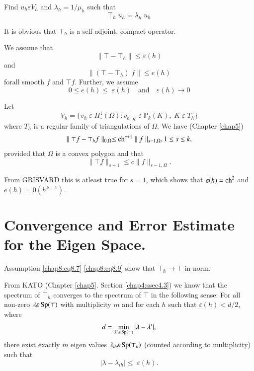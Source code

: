 Find $u_h\varepsilon V_h$ and $\lambda_h=1/\mu_h$ such that 
\begin{equation}\label{chap8:eq8.6}
\top_h\;u_h=\lambda_h\;u_h
\end{equation}

It is obvious that $\top_h$ is a self-adjoint, compact operator. 

We assume that 
\begin{equation}\label{chap8:eq8.7}
\parallel\top-\top_h\parallel\leq\varepsilon(h)
\end{equation}
and 
\begin{equation}\label{chap8:eq8.8}
\parallel (\top-\top_h)\;f\parallel \leq e(h)
\end{equation}
for\pageoriginale all smooth $f$ and $\top f$. Further, we assume 
\begin{equation}\label{chap8:eq8.9}
0\leq e(h)\leq\;\varepsilon (h)\quad\text{and}\quad\varepsilon(h)\to 0
\end{equation}
\begin{Example*}
Let 
$$
V_h=\{v_h\;\varepsilon \;H_\circ^1(\Omega):v_h|_K\;\varepsilon
\;\mathbb{P}_k(K), \;K\;\varepsilon \;T_h\}
$$
where $T_h$ is a regular family of triangulations of $\Omega$. We have
(\cf Chapter \ref{chap5})
\begin{equation}\label{chap8:eq8.10}
\parallel\top f-\top_hf\parallel_{0,\Omega}\leq\operatorname{ch}^{s+1}\parallel f
\parallel_{s-1,\Omega}, 1\leq s\leq k,
\end{equation}
provided that $\Omega$ is a convex polygon and that 
\begin{equation}\label{chap8:eq8.11}
\parallel\top f\parallel_{s+1}\leq c\parallel f\parallel_{s-1,\Omega}.
\end{equation}

From GRISVARD \cite{key22} this is atleast true for $s=1$, which shows 
that $\varepsilon(h)=\operatorname{ch}^2$ and $e(h)=0(h^{k+1})$.
\end{Example*}

\section{Convergence and Error Estimate for the Eigen
  Space.} \label{chap8:sec5} Assumption \eqref{chap8:eq8.7}
\eqref{chap8:eq8.9} show that $\top_h\to\top$ in norm.

From KATO \cite{key26} (Chapter \ref{chap5}. Section \ref{chap4:ssec4.3}) we
know that the spectrum of $\top_h$ converges to the spectrum of $\top$
in the following sense: For all non-zero $\lambda\varepsilon
\operatorname{Sp}(\top)$ with multiplicity $m$ and for each $h$ such that
$\varepsilon(h)<d/2$, where 
$$
d=\min\limits_{\lambda'\varepsilon\operatorname{Sp}(\top)}|\lambda-\lambda'|,
$$
there exist exactly $m$ eigen values $\lambda_{ih}\varepsilon
\operatorname{Sp}(\top_h)$ (counted according to multiplicity) such that 
\begin{equation*}
|\lambda-\lambda_{ih}|\leq\;\varepsilon(h).
\end{equation*}\pageoriginale

